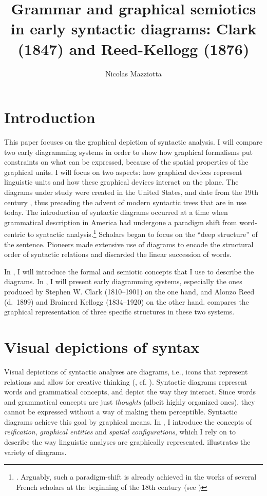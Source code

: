 \documentclass[english,output=paper,colorlinks,citecolor=brown]{../langscibook}
\author{Nicolas Mazziotta\affiliation{Université de Liège}}
\title{Grammar and graphical semiotics in early syntactic diagrams: Clark (1847) and Reed-Kellogg (1876)}
\begin{document}
\maketitle

\section{Introduction}\label{sec:4:1}

This paper focuses on the graphical depiction of syntactic analysis. I will compare two early diagramming systems in order to show how graphical formalisms put constraints on what can be expressed, because of the spatial properties of the graphical units. I will focus on two aspects: how graphical devices represent linguistic units and how these graphical devices interact on the plane. The diagrams under study were created in the United States, and date from the 19th century \citep{Brittain1973}, thus preceding the advent of modern syntactic trees that are in use today. The introduction of syntactic diagrams occurred at a time when grammatical description in America had undergone a paradigm shift from word-centric to syntactic analysis.\footnote{\textrm{\citet[76]{AartsMcMahon2006}. Arguably, such a paradigm-shift is already achieved in the works of several French scholars at the beginning of the 18th century (see \citealt{ImrenyiMazziotta2020})}} Scholars began to focus on the “deep structure” of the sentence. Pioneers made extensive use of diagrams to encode the structural order of syntactic relations and discarded the linear succession of words. 

In , I will introduce the formal and semiotic concepts that I use to describe the diagrams. In , I will present early diagramming systems, especially the ones produced by Stephen W. Clark (1810–1901) on the one hand, and Alonzo Reed (d.~1899) and Brainerd Kellogg (1834–1920) on the other hand.  compares the graphical representation of three specific structures in these two systems.

\section{Visual depictions of syntax}\label{sec:4:2}

Visual depictions of syntactic analyses are diagrams, i.e., icons that represent relations and allow for creative thinking (\citealt{Peirce1994}, cf. \citealt[36--42]{Chauvire2008}). Syntactic diagrams represent words and grammatical concepts, and depict the way they interact. Since words and grammatical concepts are just \textit{thoughts} (albeit highly organized ones), they cannot be expressed without a way of making them perceptible. Syntactic diagrams achieve this goal by graphical means. In , I introduce the concepts of \textit{reification}, \textit{graphical entities} and \textit{spatial configurations}, which I rely on to describe the way linguistic analyses are graphically represented.  illustrates the variety of diagrams. 
\end{document}
